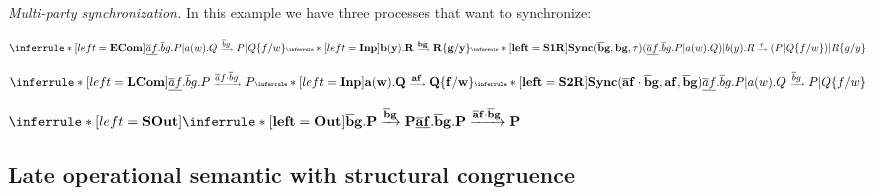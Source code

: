 \begin{example}\emph{Multi-party synchronization.}
  In this example we have three processes that want to synchronize:
  \begin{center}
    $\inferrule* [left=\tiny{\bf{ECom}}]{
	\underline{\overline{a}f}.\overline{b}g.P|a(w).Q
	  \xrightarrow{\overline{b}g} 
	    P|Q\{f/w\}
      \\
	\inferrule* [left=\bf{Inp}]{
	}{
	  b(y).R 
	    \xrightarrow{bg} 
	      R\{g/y\}
	}
      \\
	\inferrule* [left=\bf{S1R}]{
	}{
	  Sync(\overline{b}g, bg, \tau)
	}
    }{
       (\underline{\overline{a}f}.\overline{b}g.P
	|a(w).Q)
	|b(y).R 
	  \xrightarrow{\tau} 
	    (P|Q\{f/w\})|R\{g/y\}
    }$
  \end{center}

  \begin{center}$
    \inferrule* [left=\tiny{\bf{LCom}}]{
	\underline{\overline{a}f}.\overline{b}g.P
	  \xrightarrow{\overline{a}f \cdot \overline{b}g} 
	    P
      \\
	\inferrule* [left=\bf{Inp}]{
	}{
	  a(w).Q
	    \xrightarrow{af} 
	      Q\{f/w\}
	}
      \\
	\inferrule* [left=\bf{S2R}]{
	}{
	  Sync(\overline{a}f \cdot \overline{b}g, af, \overline{b}g)
	}
    }{
	\underline{\overline{a}f}.\overline{b}g.P|a(w).Q
	  \xrightarrow{\overline{b}g} 
	    P|Q\{f/w\}
    }
  $\end{center}


  \begin{center}$
    \inferrule* [left=\bf{SOut}]{
	\inferrule* [left=\bf{Out}]{
	}{
	  \overline{b}g.P
	    \xrightarrow{\overline{b}g} 
	      P
	}
    }{
	\underline{\overline{a}f}.\overline{b}g.P
	  \xrightarrow{\overline{a}f \cdot \overline{b}g} 
	    P
    }
  $
  \end{center}
\end{example}




\subsection{Late operational semantic with structural congruence}

